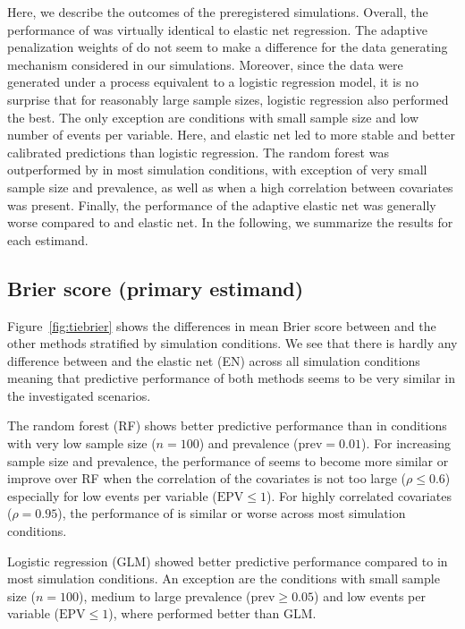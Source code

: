 
Here, we describe the outcomes of the preregistered simulations.
Overall, the performance of \ainet{} was virtually identical to elastic net
regression. The adaptive penalization weights of \ainet{} do not seem to make a
difference for the data generating mechanism considered in our simulations.
Moreover, since the data were generated under a process equivalent to a logistic
regression model, it is no surprise that for reasonably large sample sizes,
logistic regression also performed the best. The only exception are
conditions with small sample size and low number of events per variable. Here,
\ainet{} and elastic net led to more stable and better calibrated predictions
than logistic regression. The random forest was outperformed by \ainet{} in most
simulation conditions, with exception of very small sample size and prevalence,
as well as when a high correlation between covariates was present. Finally, the
performance of the adaptive elastic net was generally worse compared to
\ainet{} and elastic net. In the following, we summarize the results for each
estimand.

\subsection{Brier score (primary estimand)}
Figure~\ref{fig:tiebrier} shows the differences in mean Brier score between
\ainet{} and the other methods stratified by simulation conditions.
We see that there is hardly any difference between \ainet{} and the elastic net (EN)
across all simulation conditions meaning that predictive performance of both
methods seems to be very similar in the investigated scenarios.

The random forest (RF) shows better predictive performance than \ainet{} in
conditions with very low sample size ($n = 100$) and prevalence
($\mbox{prev} = 0.01$). For increasing sample size and prevalence, the
performance of \ainet{} seems to become more similar or improve over RF when the
correlation of the covariates is not too large ($\rho \leq 0.6$) especially for
low events per variable ($\mbox{EPV} \leq 1$). For highly correlated covariates
($\rho = 0.95$), the performance of \ainet{} is similar or worse across most
simulation conditions.

Logistic regression (GLM) showed better predictive performance compared to
\ainet{} in most simulation conditions. An exception are the conditions with
small sample size ($n = 100$), medium to large prevalence
($\mbox{prev} \geq 0.05$) and low events per variable ($\mbox{EPV} \leq 1$),
where \ainet{} performed better than GLM.


